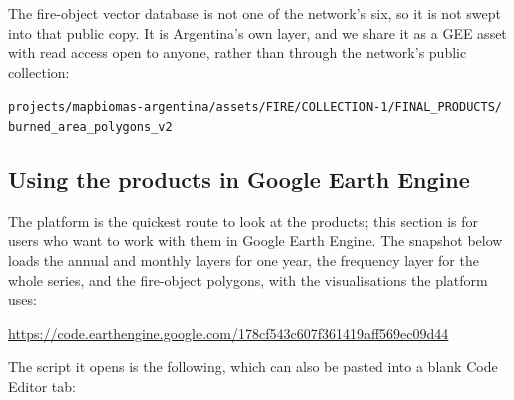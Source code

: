 \documentclass[11pt,a4paper]{article}
\begin{document}
The fire-object vector database is not one of the network's six, so it is not swept into that
public copy. It is Argentina's own layer, and we share it as a GEE asset with read access open to
anyone, rather than through the network's public collection:

\begin{center}
\small\texttt{projects/mapbiomas-argentina/assets/FIRE/COLLECTION-1/FINAL\_PRODUCTS/}\\
\small\texttt{burned\_area\_polygons\_v2}
\end{center}

\subsection{Using the products in Google Earth Engine}

The platform is the quickest route to look at the products; this section is for users who want to
work with them in Google Earth Engine. The snapshot below loads the
annual and monthly layers for one year, the frequency layer for the whole series, and the fire-object
polygons, with the visualisations the platform uses:

\begin{center}
\url{https://code.earthengine.google.com/178cf543c607f361419aff569ec09d44}
\end{center}

\noindent The script it opens is the following, which can also be pasted into a blank
Code Editor tab:
\end{document}
